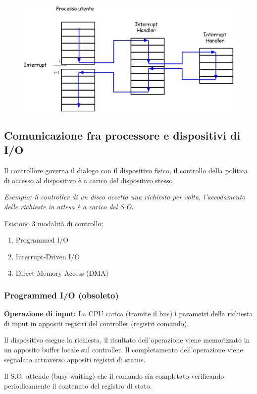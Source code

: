 \begin{figure} [h]
    \centering
    \includegraphics[width=0.7\linewidth]{Images/Screenshot 2024-12-16 140334.png}

    \label{fig:enter-label}
\end{figure}

\subsection{Comunicazione fra processore e dispositivi di I/O}
Il controllore governa il dialogo con il dispositivo fisico, il controllo della politica di accesso al dispositivo è a carico del dispositivo stesso

\textit{Esempio:
il controller di un disco accetta una richiesta per volta, 
l'accodamento delle richieste in attesa è a carico del S.O.}
\newline

Esistono 3 modalità di controllo;
\begin{enumerate}
    \item Programmed I/O
    \item Interrupt-Driven I/O
    \item Direct Memory Access (DMA)
\end{enumerate}

\subsubsection{Programmed I/O (obsoleto)}
\textbf{Operazione di input:}
\newline
La CPU carica (tramite il bus) i parametri della richiesta di input in appositi registri del controller (registri comando).

Il dispositivo esegue la richiesta, il risultato dell'operazione viene memorizzato in un apposito buffer locale sul controller. Il completamento dell'operazione viene segnalato attraverso appositi registri di status.

Il S.O. attende (busy waiting) che il comando sia completato
verificando periodicamente il contenuto del registro di stato.

